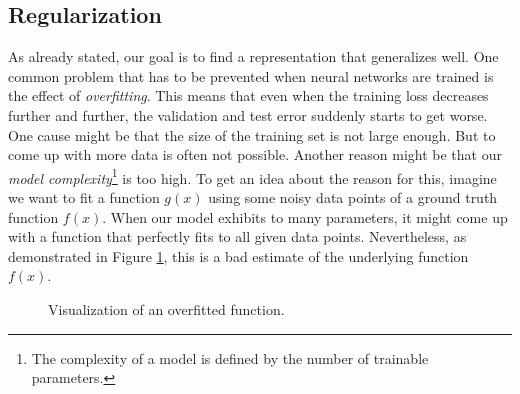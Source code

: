 \subsection{Regularization}

As already stated, our goal is to find a representation that generalizes well. One common problem that has to be prevented when neural networks are trained is the effect of \textit{overfitting}. This means that even when the training loss decreases further and further, the validation and test error suddenly starts to get worse. One cause might be that the size of the training set is not large enough. But to come up with more data is often not possible. Another reason might be that our \textit{model complexity}\footnote{The complexity of a model is defined by the number of trainable parameters.} is too high. To get an idea about the reason for this, imagine we want to fit a function $g(x)$ using some noisy data points of a ground truth function $f(x)$. When our model exhibits to many parameters, it might come up with a function that perfectly fits to all given data points. Nevertheless, as demonstrated in Figure \ref{fig:overfitting}, this is a bad estimate of the underlying function $f(x)$.

\begin{figure}[htpb]
  \centering
  \hspace*{-1.0cm}
  {
  }
  \caption[Regularization and Overfitting]{Visualization of an overfitted function.}\label{fig:overfitting}
\end{figure}


